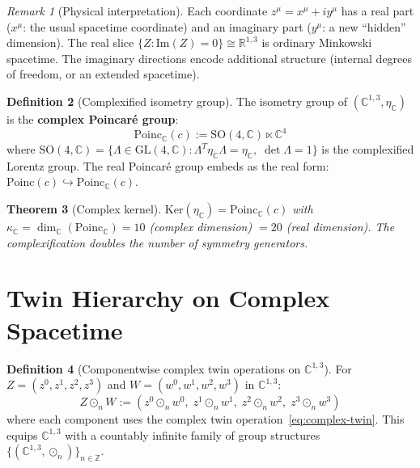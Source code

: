 \documentclass[12pt]{article}
\theoremstyle{plain}
\newtheorem{theorem}{Theorem}[section]
\theoremstyle{definition}
\newtheorem{definition}[theorem]{Definition}
\theoremstyle{remark}
\newtheorem{remark}[theorem]{Remark}
\newcommand{\Ker}{\mathrm{Ker}}
\newcommand{\Poinc}{\mathrm{Poinc}}
\newcommand{\SO}{\mathrm{SO}}
\newcommand{\GL}{\mathrm{GL}}
\newcommand{\CC}{\mathbb{C}}
\newcommand{\RR}{\mathbb{R}}
\newcommand{\ZZ}{\mathbb{Z}}
\begin{document}
\begin{remark}[Physical interpretation]
Each coordinate $z^\mu = x^\mu + iy^\mu$ has a real part ($x^\mu$: the usual spacetime coordinate) and an imaginary part ($y^\mu$: a new ``hidden'' dimension). The real slice $\{Z : \mathrm{Im}(Z) = 0\} \cong \RR^{1,3}$ is ordinary Minkowski spacetime. The imaginary directions encode additional structure (internal degrees of freedom, or an extended spacetime).
\end{remark}

\begin{definition}[Complexified isometry group]\label{def:complex-isom}
The isometry group of $(\CC^{1,3}, \eta_\CC)$ is the \textbf{complex Poincar\'e group}:
\begin{equation}
\Poinc_\CC(c) := \SO(4, \CC) \ltimes \CC^4
\end{equation}
where $\SO(4, \CC) = \{\Lambda \in \GL(4, \CC) : \Lambda^T\eta_\CC\Lambda = \eta_\CC,\; \det\Lambda = 1\}$ is the complexified Lorentz group. The real Poincar\'e group embeds as the real form: $\Poinc(c) \hookrightarrow \Poinc_\CC(c)$.
\end{definition}

\begin{theorem}[Complex kernel]\label{thm:complex-kernel}
$\Ker(\eta_\CC) = \Poinc_\CC(c)$ with $\kappa_\CC = \dim_\CC(\Poinc_\CC) = 10$ (complex dimension) $= 20$ (real dimension). The complexification doubles the number of symmetry generators.
\end{theorem}


\section{Twin Hierarchy on Complex Spacetime}
\label{sec:complex-twin-st}

\begin{definition}[Componentwise complex twin operations on $\CC^{1,3}$]\label{def:twin-st}
For $Z = (z^0, z^1, z^2, z^3)$ and $W = (w^0, w^1, w^2, w^3)$ in $\CC^{1,3}$:
\begin{equation}
Z \odot_n W := (z^0 \odot_n w^0,\; z^1 \odot_n w^1,\; z^2 \odot_n w^2,\; z^3 \odot_n w^3)
\end{equation}
where each component uses the complex twin operation~\eqref{eq:complex-twin}. This equips $\CC^{1,3}$ with a countably infinite family of group structures $\{(\CC^{1,3}, \odot_n)\}_{n \in \ZZ}$.
\end{definition}
\end{document}

